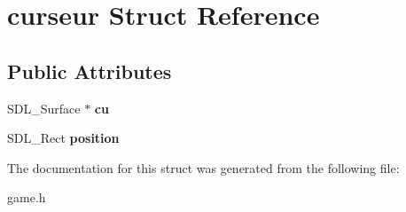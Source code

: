 \hypertarget{structcurseur}{}\section{curseur Struct Reference}
\label{structcurseur}
\subsection*{Public Attributes}
\begin{DoxyCompactItemize}
\item 
\mbox{\label{structcurseur_a2232c546c5bbf7873bcb7dd6c81ee9fd}} 
S\+D\+L\+\_\+\+Surface $\ast$ {\bfseries cu}
\item 
\mbox{\label{structcurseur_affe6df541630a06defae865e8e27ad81}} 
S\+D\+L\+\_\+\+Rect {\bfseries position}
\end{DoxyCompactItemize}


The documentation for this struct was generated from the following file\+:\begin{DoxyCompactItemize}
\item 
game.\+h\end{DoxyCompactItemize}
